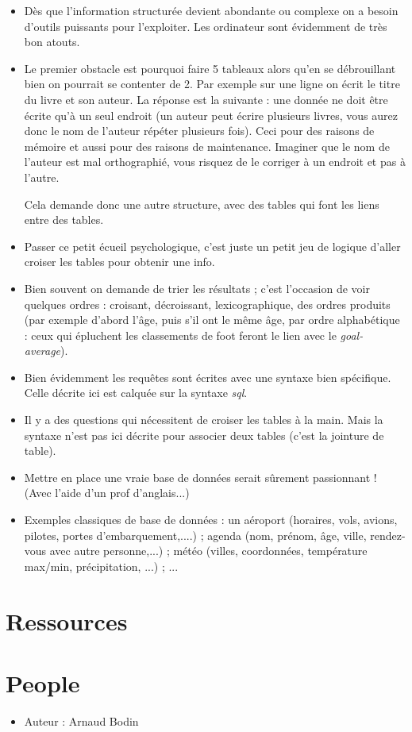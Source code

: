 \documentclass[class=report,crop=false, 12pt]{standalone}
\begin{document}
\begin{itemize}
  \item Dès que l'information structurée devient abondante ou complexe on a besoin d'outils puissants pour l'exploiter. Les ordinateur sont évidemment de très bon atouts.
  
  
  \item Le premier obstacle est pourquoi faire 5 tableaux alors qu'en se débrouillant bien on pourrait se contenter de 2. Par exemple sur une ligne on écrit le titre du livre et son auteur. La réponse est la suivante :
  une donnée ne doit être écrite qu'à un seul endroit (un auteur peut écrire plusieurs livres, vous aurez donc le nom de l'auteur répéter plusieurs fois). Ceci pour des raisons de mémoire et aussi pour des raisons de maintenance. Imaginer que le nom de l'auteur est mal orthographié, vous risquez de le corriger à un endroit et pas à l'autre. 
  
  Cela demande donc une autre structure, avec des tables qui font les liens entre des tables. 
  
  
  \item Passer ce petit écueil psychologique, c'est juste un petit jeu de logique d'aller croiser les tables pour obtenir une info.
  
  \item Bien souvent on demande de trier les résultats ; c'est l'occasion de voir quelques ordres : croisant, décroissant, lexicographique, des ordres produits (par exemple d'abord l'âge, puis s'il ont le même âge, par ordre alphabétique : ceux qui épluchent les classements de foot feront le lien avec le \emph{goal-average}).
  
  \item Bien évidemment les requêtes sont écrites avec une syntaxe bien spécifique. Celle décrite ici est calquée sur la syntaxe \emph{sql}.
  
  \item Il y a des questions qui nécessitent de croiser les tables à la main. Mais la syntaxe n'est pas ici décrite pour associer deux tables (c'est la jointure de table).
  
  \item Mettre en place une vraie base de données serait sûrement passionnant ! 
(Avec l'aide d'un prof d'anglais...)

  \item Exemples classiques de base de données : un aéroport (horaires, vols, avions, pilotes, portes d'embarquement,....) ; agenda (nom, prénom, âge, ville, rendez-vous avec autre personne,...) ; météo (villes, coordonnées, température max/min, précipitation, ...) ; ...

\end{itemize}


\section*{Ressources}


\section*{People}

\begin{itemize}
  \item Auteur : Arnaud Bodin
\end{itemize}
\end{document}
